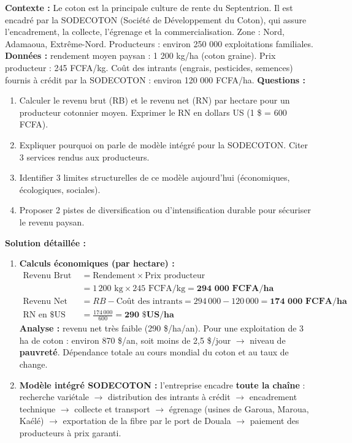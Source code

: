 \documentclass[11pt]{article}
\begin{document}
\begin{exoresolu}
\textbf{Contexte :} Le coton est la principale culture de rente du Septentrion. Il est encadré par la SODECOTON (Société de Développement du Coton), qui assure l'encadrement, la collecte, l'égrenage et la commercialisation. Zone : Nord, Adamaoua, Extrême-Nord. Producteurs : environ 250 000 exploitations familiales.
\textbf{Données :} rendement moyen paysan : 1 200 kg/ha (coton graine). Prix producteur : 245 FCFA/kg. Coût des intrants (engrais, pesticides, semences) fournis à crédit par la SODECOTON : environ 120 000 FCFA/ha.
\textbf{Questions :}
\begin{enumerate}
    \item Calculer le revenu brut (RB) et le revenu net (RN) par hectare pour un producteur cotonnier moyen. Exprimer le RN en dollars US (1 \$ = 600 FCFA).
    \item Expliquer pourquoi on parle de \og modèle intégré \fg{} pour la SODECOTON. Citer 3 services rendus aux producteurs.
    \item Identifier 3 limites structurelles de ce modèle aujourd'hui (économiques, écologiques, sociales).
    \item Proposer 2 pistes de diversification ou d'intensification durable pour sécuriser le revenu paysan.
\end{enumerate}
\tcblower
\textbf{Solution détaillée :}
\begin{enumerate}
    \item \textbf{Calculs économiques (par hectare) :}
    \begin{align*}
        \text{Revenu Brut (RB)} &= \text{Rendement} \times \text{Prix producteur} \\
        &= 1\,200 \text{ kg} \times 245 \text{ FCFA/kg} = \textbf{294 000 FCFA/ha} \\
        \text{Revenu Net (RN)} &= RB - \text{Coût des intrants} = 294\,000 - 120\,000 = \textbf{174 000 FCFA/ha} \\
        \text{RN en \$US} &= \frac{174\,000}{600} = \textbf{290 \$US/ha}
    \end{align*}
    \textbf{Analyse :} revenu net très faible (290 \$/ha/an). Pour une exploitation de 3 ha de coton : environ 870 \$/an, soit moins de 2,5 \$/jour $\rightarrow$ niveau de \textbf{pauvreté}. Dépendance totale au cours mondial du coton et au taux de change.
    \item \textbf{Modèle intégré SODECOTON :} l'entreprise encadre \textbf{toute la chaîne} : recherche variétale $\rightarrow$ distribution des intrants à crédit $\rightarrow$ encadrement technique $\rightarrow$ collecte et transport $\rightarrow$ égrenage (usines de Garoua, Maroua, Kaélé) $\rightarrow$ exportation de la fibre par le port de Douala $\rightarrow$ paiement des producteurs à prix garanti.

\end{enumerate}
\end{exoresolu}
\end{document}
